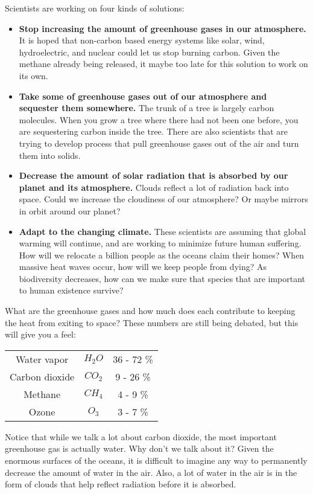 Scientists are working on four kinds of solutions:
\begin{itemize}
  \item \textbf{Stop increasing the amount of greenhouse gases in our
    atmosphere.} It is hoped that non-carbon based energy systems like
    solar, wind, hydroelectric, and nuclear could let us stop burning
    carbon. Given the methane already being released, it maybe too
    late for this solution to work on its own.

  \item \textbf{Take some of greenhouse gases out of our atmosphere and
    sequester them somewhere.} The trunk of a tree is largely carbon
    molecules. When you grow a tree where there had not been one
    before, you are sequestering carbon inside the tree.  There are
    also scientists that are trying to develop process that pull
    greenhouse gases out of the air and turn them into solids.

  \item \textbf{Decrease the amount of solar radiation that is
    absorbed by our planet and its atmosphere.} Clouds reflect a lot of radiation back into
    space. Could we increase the cloudiness of our atmosphere? Or
    maybe  mirrors in orbit around our planet?

  \item \textbf{Adapt to the changing climate.} These scientists are
    assuming that global warming will continue, and are working to
    minimize future human suffering. How will we relocate a billion
    people as the oceans claim their homes?  When massive heat waves
    occur, how will we keep people from dying?  As biodiversity
    decreases, how can we make sure that species that are important to
    human existence survive?
    
\end{itemize}

What are the greenhouse gases and how much does each contribute to
keeping the heat from exiting to space?  These numbers are still being
debated, but this will give you a feel:
\begin{tabular}{c | c | c}
  Water vapor & $H_2O$ & 36 - 72 \% \\
  Carbon dioxide & $CO_2$ & 9 - 26 \% \\
  Methane & $CH_4$ & 4 - 9 \% \\
  Ozone & $O_3$ & 3 - 7 \%
\end{tabular}

Notice that while we talk a lot about carbon dioxide, the most
important greenhouse gas is actually water.  Why don't we talk about
it? Given the enormous surfaces of the oceans, it is difficult to
imagine any way to permanently decrease the amount of water in the
air. Also, a lot of water in the air is in the form of clouds that
help reflect radiation before it is absorbed.

